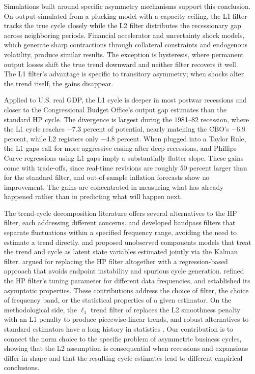 \documentclass[10pt]{article}
\begin{document}
Simulations built around specific asymmetry mechanisms support this conclusion. On output simulated from a plucking model with a capacity ceiling, the L1 filter tracks the true cycle closely while the L2 filter distributes the recessionary gap across neighboring periods. Financial accelerator and uncertainty shock models, which generate sharp contractions through collateral constraints and endogenous volatility, produce similar results. The exception is hysteresis, where permanent output losses shift the true trend downward and neither filter recovers it well. The L1 filter's advantage is specific to transitory asymmetry; when shocks alter the trend itself, the gains disappear.

Applied to U.S. real GDP, the L1 cycle is deeper in most postwar recessions and closer to the Congressional Budget Office's output gap estimates than the standard HP cycle. The divergence is largest during the 1981--82 recession, where the L1 cycle reaches $-7.3$ percent of potential, nearly matching the CBO's $-6.9$ percent, while L2 registers only $-4.8$ percent. When plugged into a Taylor Rule, the L1 gaps call for more aggressive easing after deep recessions, and Phillips Curve regressions using L1 gaps imply a substantially flatter slope. These gains come with trade-offs, since real-time revisions are roughly 50 percent larger than for the standard filter, and out-of-sample inflation forecasts show no improvement. The gains are concentrated in measuring what has already happened rather than in predicting what will happen next.

The trend-cycle decomposition literature offers several alternatives to the HP filter, each addressing different concerns. \citet{baxter_king1999} and \citet{christiano_fitzgerald2003} developed bandpass filters that separate fluctuations within a specified frequency range, avoiding the need to estimate a trend directly. \citet{harvey1985} and \citet{clark1987} proposed unobserved components models that treat the trend and cycle as latent state variables estimated jointly via the Kalman filter. \citet{hamilton2018} argued for replacing the HP filter altogether with a regression-based approach that avoids endpoint instability and spurious cycle generation. \citet{ravn_uhlig2002} refined the HP filter's tuning parameter for different data frequencies, and \citet{phillips_jin2021} established its asymptotic properties. These contributions address the choice of filter, the choice of frequency band, or the statistical properties of a given estimator. On the methodological side, the $\ell_1$ trend filter of \citet{kim_etal2009} replaces the L2 smoothness penalty with an L1 penalty to produce piecewise-linear trends, and robust alternatives to standard estimators have a long history in statistics \citep{huber1964, koenker_bassett1978}. Our contribution is to connect the norm choice to the specific problem of asymmetric business cycles, showing that the L2 assumption is consequential when recessions and expansions differ in shape and that the resulting cycle estimates lead to different empirical conclusions.
\end{document}

